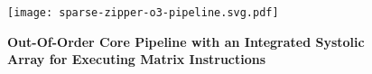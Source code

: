 \begin{figure}[tp]
    \centering
    \texttt{[image: sparse-zipper-o3-pipeline.svg.pdf]}
    \caption[Out-Of-Order Core Pipeline with an Integrated Systolic Array]{
      \textbf{Out-Of-Order Core Pipeline with an Integrated Systolic Array for Executing Matrix Instructions}
    }
    \label{fig:spz-sparse-zipper-o3-pipeline}
\end{figure}
